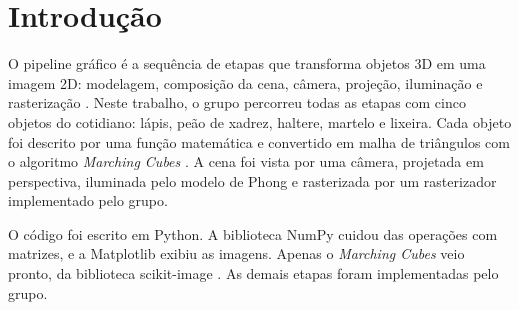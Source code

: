 \section{Introdução}\label{sec:introducao}

O pipeline gráfico é a sequência de etapas que transforma objetos 3D em uma imagem 2D: modelagem,
composição da cena, câmera, projeção, iluminação e rasterização \cite{azevedo2018}.
 Neste trabalho, o grupo
percorreu todas as etapas com cinco objetos do cotidiano: lápis, peão de xadrez, haltere, martelo e
lixeira. Cada objeto foi descrito por uma função matemática e convertido em malha de triângulos com
o algoritmo \textit{Marching Cubes} \cite{lorensen1987}. A cena foi vista por uma câmera,
projetada em perspectiva, iluminada pelo modelo de Phong \cite{phong1975} e rasterizada por um
rasterizador implementado pelo grupo.

O código foi escrito em Python. A biblioteca NumPy \cite{harris2020} cuidou das operações com
matrizes, e a Matplotlib \cite{hunter2007} exibiu as imagens. Apenas o \textit{Marching Cubes}
veio pronto, da biblioteca scikit-image \cite{vanderwalt2014}. As demais etapas foram
implementadas pelo grupo.
